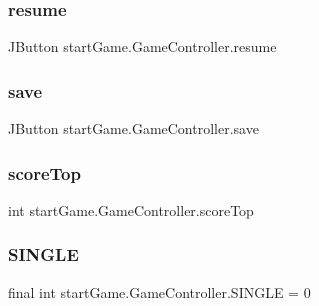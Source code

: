 \subsubsection{\texorpdfstring{resume}{resume}}
{\footnotesize\ttfamily J\+Button start\+Game.\+Game\+Controller.\+resume\hspace{0.3cm}{\ttfamily [private]}}

\hypertarget{classstart_game_1_1_game_controller_a2a8cdec30f5a04777d2e90d354bb4dd4}{}\label{classstart_game_1_1_game_controller_a2a8cdec30f5a04777d2e90d354bb4dd4} 
\subsubsection{\texorpdfstring{save}{save}}
{\footnotesize\ttfamily J\+Button start\+Game.\+Game\+Controller.\+save\hspace{0.3cm}{\ttfamily [private]}}

\hypertarget{classstart_game_1_1_game_controller_af55ee2997cc74f6aee8720fec11f4063}{}\label{classstart_game_1_1_game_controller_af55ee2997cc74f6aee8720fec11f4063} 
\subsubsection{\texorpdfstring{score\+Top}{scoreTop}}
{\footnotesize\ttfamily int start\+Game.\+Game\+Controller.\+score\+Top\hspace{0.3cm}{\ttfamily [private]}}

\hypertarget{classstart_game_1_1_game_controller_a38526b0e4bd8fd7078ec988678af462d}{}\label{classstart_game_1_1_game_controller_a38526b0e4bd8fd7078ec988678af462d} 
\subsubsection{\texorpdfstring{S\+I\+N\+G\+LE}{SINGLE}}
{\footnotesize\ttfamily final int start\+Game.\+Game\+Controller.\+S\+I\+N\+G\+LE = 0\hspace{0.3cm}{\ttfamily [private]}}

